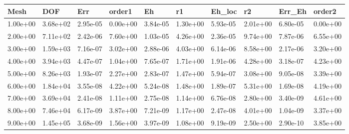 \begin{tabular}{llllllllll}
Mesh & DOF & Err & order1 & Eh & r1 & Eh_loc & r2 & Err_Eh & order2 \\ 
\hline 
1.00e+00 & 3.68e+02 & 2.95e-05 & 0.00e+00 & 3.84e-05 & 1.30e+00 & 5.93e-05 & 2.01e+00 & 6.80e-05 & 0.00e+00 \\ 
2.00e+00 & 7.11e+02 & 2.42e-06 & 7.60e+00 & 1.03e-05 & 4.26e+00 & 2.36e-05 & 9.74e+00 & 7.87e-06 & 6.55e+00 \\ 
3.00e+00 & 1.59e+03 & 7.16e-07 & 3.02e+00 & 2.88e-06 & 4.03e+00 & 6.14e-06 & 8.58e+00 & 2.17e-06 & 3.20e+00 \\ 
4.00e+00 & 3.94e+03 & 4.47e-07 & 1.04e+00 & 7.65e-07 & 1.71e+00 & 1.91e-06 & 4.28e+00 & 3.18e-07 & 4.23e+00 \\ 
5.00e+00 & 8.26e+03 & 1.93e-07 & 2.27e+00 & 2.83e-07 & 1.47e+00 & 5.94e-07 & 3.08e+00 & 9.05e-08 & 3.39e+00 \\ 
6.00e+00 & 1.84e+04 & 3.55e-08 & 4.22e+00 & 5.24e-08 & 1.48e+00 & 1.89e-07 & 5.31e+00 & 1.69e-08 & 4.19e+00 \\ 
7.00e+00 & 3.69e+04 & 2.41e-08 & 1.11e+00 & 2.75e-08 & 1.14e+00 & 6.76e-08 & 2.80e+00 & 3.40e-09 & 4.61e+00 \\ 
8.00e+00 & 7.46e+04 & 6.17e-09 & 3.87e+00 & 7.21e-09 & 1.17e+00 & 2.47e-08 & 4.01e+00 & 1.04e-09 & 3.37e+00 \\ 
9.00e+00 & 1.45e+05 & 3.68e-09 & 1.56e+00 & 3.97e-09 & 1.08e+00 & 9.19e-09 & 2.50e+00 & 2.90e-10 & 3.85e+00 \\ 
\hline 
\end{tabular}